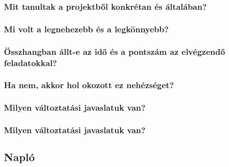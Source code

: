 		\subsubsection*{Mit tanultak a projektből konkrétan és általában?}
		
		\subsubsection*{Mi volt a legnehezebb és a legkönnyebb?}
		
		\subsubsection*{Összhangban állt-e az idő és a pontszám az elvégzendő feladatokkal?}
		
		\subsubsection*{Ha nem, akkor hol okozott ez nehézséget?}
		
		\subsubsection*{Milyen változtatási javaslatuk van?}
		
		\subsubsection*{Milyen változtatási javaslatuk van?}
		
	\subsection{Napló}

